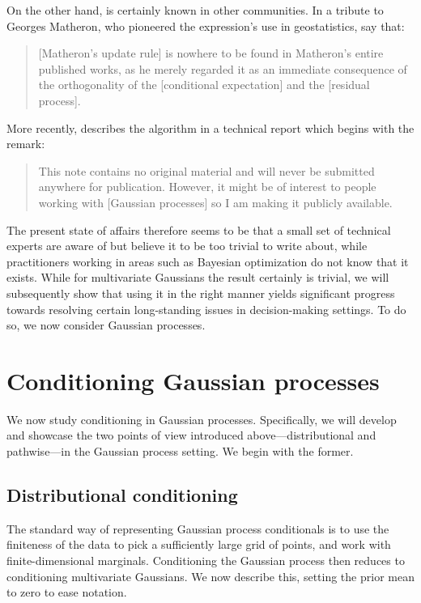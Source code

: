 \documentclass[11pt]{book}
\begin{document}
On the other hand,  is certainly known in other communities.
In a tribute to Georges Matheron, who pioneered the expression's use in geostatistics, \textcite{chiles05} say that:

\begin{quotation}
[Matheron's update rule] is nowhere to be found in Matheron's entire published works, as he merely regarded it as an immediate consequence of the orthogonality of the [conditional expectation] and the [residual process].
\end{quotation}

More recently, \textcite{doucet10} describes the algorithm in a technical report which begins with the remark: 

\begin{quotation}
This note contains no original material and will never be submitted anywhere for publication. However, it might be of interest to people working with [Gaussian processes] so I am making it publicly available.
\end{quotation}

The present state of affairs therefore seems to be that a small set of technical experts are aware of  but believe it to be too trivial to write about, while practitioners working in areas such as Bayesian optimization do not know that it exists.
While for multivariate Gaussians the result certainly is trivial, we will subsequently show that using it in the right manner yields significant progress towards resolving certain long-standing issues in decision-making settings.
To do so, we now consider Gaussian processes.

\section{Conditioning Gaussian processes}

We now study conditioning in Gaussian processes.
Specifically, we will develop and showcase the two points of view introduced above---distributional and pathwise---in the Gaussian process setting.
We begin with the former.

\subsection{Distributional conditioning}

The standard way of representing Gaussian process conditionals is to use the finiteness of the data to pick a sufficiently large grid of points, and work with finite-dimensional marginals.
Conditioning the Gaussian process then reduces to conditioning multivariate Gaussians.
We now describe this, setting the prior mean to zero to ease notation.
\end{document}
